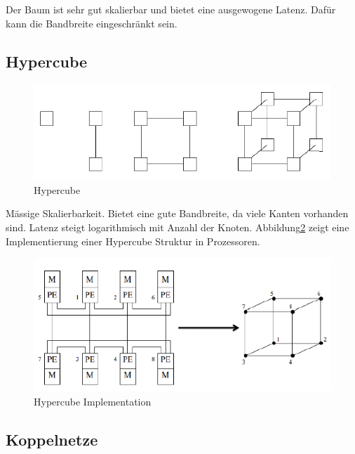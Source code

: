 Der Baum ist sehr gut skalierbar und bietet eine ausgewogene Latenz. Dafür kann die Bandbreite eingeschränkt sein.

\subsection{Hypercube}
\begin{figure}
\centering
\includegraphics[width=0.7\linewidth]{fig/hypercube}
\caption{Hypercube}
\label{fig:hypercube}
\end{figure}

Mässige Skalierbarkeit. Bietet eine gute Bandbreite, da viele Kanten vorhanden sind. Latenz steigt logarithmisch mit Anzahl der Knoten. Abbildung\ref{fig:hypercube_impl} zeigt eine Implementierung einer Hypercube Struktur in Prozessoren.

\begin{figure}
\centering
\includegraphics[width=0.7\linewidth]{fig/hypercube_impl}
\caption{Hypercube Implementation}
\label{fig:hypercube_impl}
\end{figure}

\subsection{Koppelnetze}
